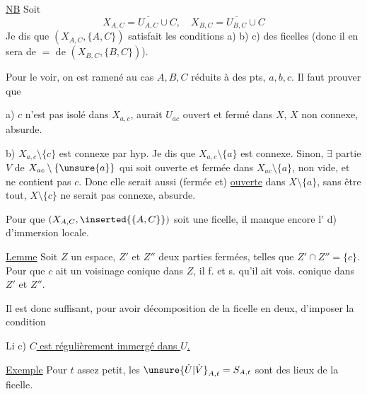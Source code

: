 


\uline{NB} Soit
\[
X_{A,C}=\overline{U_{A,C}}\cup C,\quad
X_{B,C}=\overline{U_{B,C}}\cup C
\]
Je dis que $(X_{A,C},\{A,C\})$ satisfait les conditions a) b) c) des ficelles
(donc il en sera de $=$ de $(X_{B,C},\{B,C\})$).

Pour le voir, on est ramené au cas $A,B,C$ réduits à des pts, $a,b,c$.
Il faut prouver que

a)  $c$ n'est pas isolé dans $X_{a,c}$,
  aurait $U_{ac}$ ouvert et fermé dans $X$,
$X$  non connexe, absurde.

b) $X_{a,c}\setminus\{c\}$ est connexe par hyp.
Je dis que $X_{a,c}\setminus\{a\}$ est connexe.
Sinon,  $\exists$ partie $V$ de $X_{ac}\setminus\{\unsure{a}\}$ qui soit ouverte et fermée dans $X_{ac}\setminus\{a\}$,
non vide, et ne contient pas $c$.
Donc elle serait aussi  (fermée et) \uline{ouverte}
dans $X\setminus\{a\}$, sans  être tout,
$X\setminus\{c\}$ ne serait pas connexe, absurde.

Pour que $(X_{A,C},\inserted{\{A,C\}})$ soit une ficelle,
il manque encore l' d) d'immersion locale.


\uline{Lemme} Soit $Z$ un espace, $Z'$ et $Z''$ deux parties fermées, telles que
$Z'\cap Z''=\{c\}$.
Pour que $c$ ait un voisinage conique dans $Z$, il f. et s. qu'il ait vois. conique dans $Z'$ et $Z''$.

Il est donc suffisant, pour avoir  décomposition de la ficelle en deux, d'imposer la condition

Li c) \uline{$C$ est régulièrement immergé dans $U$.}

\uline{Exemple} Pour $t$ assez petit, les $\unsure{\dot U|\dot V}_{A,t}=S_{A,t}$ sont des  lieux de la ficelle.

